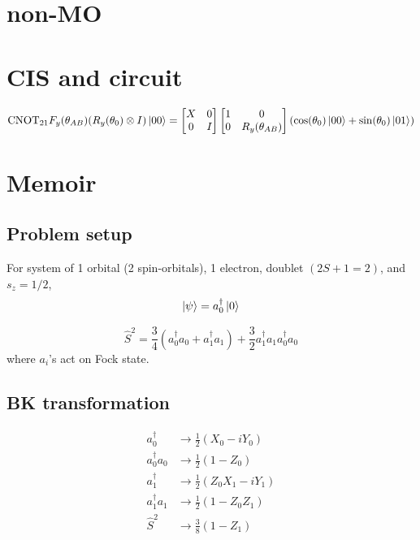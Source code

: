 \documentclass[11pt, oneside]{article}   	%
\begin{document}
\section{non-MO}

\section{CIS and circuit}
\begin{align}
\mathrm{CNOT}_{21} F_y(\theta_{AB}) (R_y(\theta_0) \otimes I) \ket{00} 
= 
\begin{bmatrix}
X & 0 \\
0 & I
\end{bmatrix}
\begin{bmatrix}
1 & 0 \\
0 & R_y(\theta_{AB})
\end{bmatrix}
(\cos(\theta_0) \ket{00} + \sin(\theta_0)\ket{01})
\end{align}


\section{Memoir}
\subsection{Problem setup}
For system of 1 orbital (2 spin-orbitals), 1 electron, doublet $(2 S + 1 = 2)$, and $s_z = 1/2$, 
\begin{equation}
\ket{\psi} = a^{\dagger}_0 \ket{0}
\end{equation}

\begin{equation}
\hat{S}^2 = \frac{3}{4} (a^{\dagger}_0 a_0 + a^{\dagger}_1 a_1) + \frac{3}{2} a^{\dagger}_1 a_1 a^{\dagger}_0 a_0
\end{equation}
where $a_i$'s act on Fock state.

\subsection{BK transformation}
\begin{align}
a^{\dagger}_0 &\to \frac{1}{2} (X_0 - i Y_0) \\
a^{\dagger}_0 a_0 &\to \frac{1}{2} (1 - Z_0) \\
a^{\dagger}_1 &\to \frac{1}{2} (Z_0 X_1 - i Y_1) \\
a^{\dagger}_1 a_1 &\to \frac{1}{2} (1 - Z_0 Z_1) \\
\hat{S}^2 &\to \frac{3}{8} (1 - Z_1) 
\end{align}
\end{document}
